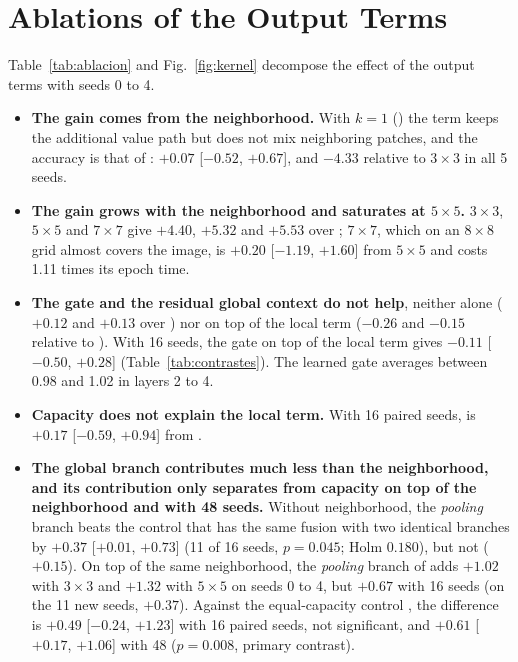 \section{Ablations of the Output Terms}
\label{sec:sup-ablacion}
Table~\ref{tab:ablacion} and Fig.~\ref{fig:kernel} decompose the effect of the output terms with seeds 0 to 4.
\begin{itemize}
  \item \textbf{The gain comes from the neighborhood.} With $k=1$ () the term keeps the additional value path but does not mix neighboring patches, and the accuracy is that of : $+0.07$ [$-0.52$, $+0.67$], and $-4.33$ relative to $3\times3$ in all 5 seeds.
  \item \textbf{The gain grows with the neighborhood and saturates at $5\times5$.} $3\times3$, $5\times5$ and $7\times7$ give $+4.40$, $+5.32$ and $+5.53$ over ; $7\times7$, which on an $8\times8$ grid almost covers the image, is $+0.20$ [$-1.19$, $+1.60$] from $5\times5$ and costs 1.11 times its epoch time.
  \item \textbf{The gate and the residual global context do not help}, neither alone ($+0.12$ and $+0.13$ over ) nor on top of the local term ($-0.26$ and $-0.15$ relative to ). With 16 seeds, the gate on top of the local term gives $-0.11$ [$-0.50$, $+0.28$] (Table~\ref{tab:contrastes}). The learned gate averages between 0.98 and 1.02 in layers 2 to 4.
  \item \textbf{Capacity does not explain the local term.} With 16 paired seeds,  is $+0.17$ [$-0.59$, $+0.94$] from .
  \item \textbf{The global branch contributes much less than the neighborhood, and its contribution only separates from capacity on top of the neighborhood and with 48 seeds.} Without neighborhood, the \emph{pooling} branch beats the control that has the same fusion with two identical  branches by $+0.37$ [$+0.01$, $+0.73$] (11 of 16 seeds, $p=0.045$; Holm $0.180$), but not  ($+0.15$). On top of the same neighborhood, the \emph{pooling} branch of  adds $+1.02$ with $3\times3$ and $+1.32$ with $5\times5$ on seeds 0 to 4, but $+0.67$ with 16 seeds (on the 11 new seeds, $+0.37$). Against the equal-capacity control , the difference is $+0.49$ [$-0.24$, $+1.23$] with 16 paired seeds, not significant, and $+0.61$ [$+0.17$, $+1.06$] with 48 ($p=0.008$, primary contrast).

\end{itemize}
